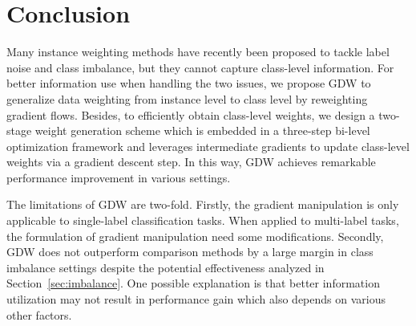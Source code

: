 \section{Conclusion}
Many instance weighting methods have recently been proposed to tackle label noise and class imbalance, but they cannot capture class-level information.
%
For better information use when handling the two issues, we propose GDW to generalize data weighting from instance level to class level by reweighting gradient flows.
%
Besides, to efficiently obtain class-level weights, we design a two-stage weight generation scheme which is embedded in a three-step bi-level optimization framework and leverages intermediate gradients to update class-level weights via a gradient descent step.
%
In this way, GDW achieves remarkable performance improvement in various settings.

%
The limitations of GDW are two-fold.
%
Firstly, the gradient manipulation is only applicable to single-label classification tasks.
%
When applied to multi-label tasks, the formulation of gradient manipulation need some modifications.
%
Secondly, GDW does not outperform comparison methods by a large margin in class imbalance settings despite the potential effectiveness analyzed in Section~\ref{sec:imbalance}.
%
One possible explanation is that better information utilization may not result in performance gain which also depends on various other factors.